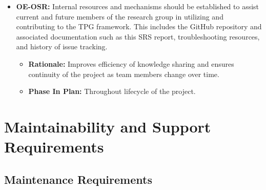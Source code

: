 \documentclass[12pt]{article}
\newcommand{\lips}{\textit{Insert your content here.}}
\begin{document}
\begin{itemize}
\item \label{OE-OSR} \textbf{OE-OSR:} Internal resources and mechanisms should be established to assist current and future members of the research group in utilizing and contributing to the TPG framework. This includes the GitHub repository and associated documentation such as this SRS report, troubleshooting resources, and history of issue tracking.
  \begin{itemize}
    \item \textbf{Rationale:} Improves efficiency of knowledge sharing and ensures continuity of the project as team members change over time.
    \item \textbf{Phase In Plan:} Throughout lifecycle of the project.
  \end{itemize}
\end{itemize}

\section{Maintainability and Support Requirements}
\subsection{Maintenance Requirements}
\end{document}
